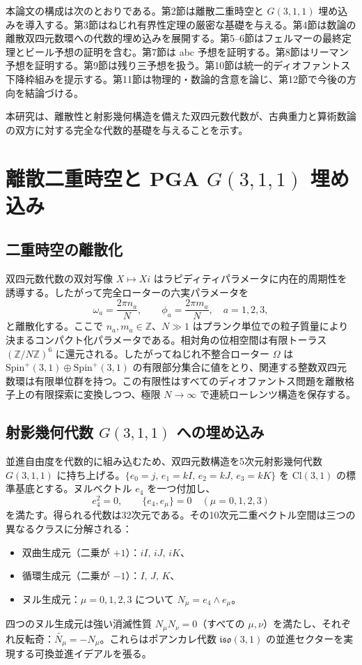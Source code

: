 \documentclass[dvipdfmx,a4paper]{article}
\theoremstyle{definition}
\theoremstyle{remark}
\begin{document}
本論文の構成は次のとおりである。第2節は離散二重時空と $G(3,1,1)$ 埋め込みを導入する。第3節はねじれ有界性定理の厳密な基礎を与える。第4節は数論の離散双四元数環への代数的埋め込みを展開する。第5--6節はフェルマーの最終定理とビール予想の証明を含む。第7節は abc 予想を証明する。第8節はリーマン予想を証明する。第9節は残り三予想を扱う。第10節は統一的ディオファントス下降枠組みを提示する。第11節は物理的・数論的含意を論じ、第12節で今後の方向を結論づける。

本研究は、離散性と射影幾何構造を備えた双四元数代数が、古典重力と算術数論の双方に対する完全な代数的基礎を与えることを示す。

\section{離散二重時空と PGA \texorpdfstring{$G(3,1,1)$}{G(3,1,1)} 埋め込み}

\subsection{二重時空の離散化}

双四元数代数の双対写像 $X \mapsto Xi$ はラピディティパラメータに内在的周期性を誘導する。したがって完全ローターの六実パラメータを
\[
\omega_a = \frac{2\pi n_a}{N}, \qquad \phi_a = \frac{2\pi m_a}{N}, \quad a=1,2,3,
\]
と離散化する。ここで $n_a, m_a \in \mathbb{Z}$、$N \gg 1$ はプランク単位での粒子質量により決まるコンパクト化パラメータである。相対角の位相空間は有限トーラス $(\mathbb{Z}/N\mathbb{Z})^6$ に還元される。したがってねじれ不整合ローター $\Omega$ は $\mathrm{Spin}^+(3,1) \oplus \mathrm{Spin}^+(3,1)$ の有限部分集合に値をとり、関連する整数双四元数環は有限単位群を持つ。この有限性はすべてのディオファントス問題を離散格子上の有限探索に変換しつつ、極限 $N \to \infty$ で連続ローレンツ構造を保存する。

\subsection{射影幾何代数 \texorpdfstring{$G(3,1,1)$}{G(3,1,1)} への埋め込み}

並進自由度を代数的に組み込むため、双四元数構造を5次元射影幾何代数 $G(3,1,1)$ に持ち上げる。$\{e_0 = j,\, e_1 = kI,\, e_2 = kJ,\, e_3 = kK\}$ を $\mathrm{Cl}(3,1)$ の標準基底とする。ヌルベクトル $e_4$ を一つ付加し、
\[
e_4^2 = 0, \qquad \{e_4, e_\mu\} = 0 \quad (\mu = 0,1,2,3)
\]
を満たす。得られる代数は32次元である。その10次元二重ベクトル空間は三つの異なるクラスに分解される：
\begin{itemize}
  \item 双曲生成元（二乗が $+1$）：$iI,\, iJ,\, iK$、
  \item 循環生成元（二乗が $-1$）：$I,\, J,\, K$、
  \item ヌル生成元：$\mu = 0,1,2,3$ について $N_\mu = e_4 \wedge e_\mu$。
\end{itemize}
四つのヌル生成元は強い消滅性質 $N_\mu N_\nu = 0$（すべての $\mu,\nu$）を満たし、それぞれ反転奇：$\widetilde{N_\mu} = -N_\mu$。これらはポアンカレ代数 $\mathfrak{iso}(3,1)$ の並進セクターを実現する可換並進イデアルを張る。
\end{document}
